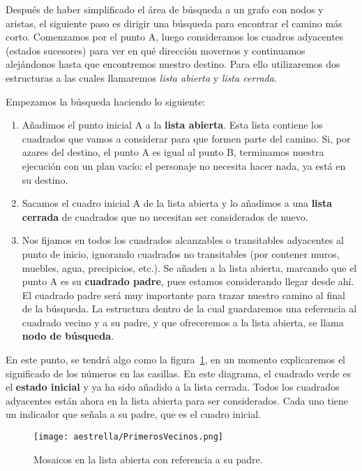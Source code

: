 Después de haber simplificado el área de búsqueda a un grafo con nodos y aristas, el siguiente paso es dirigir una búsqueda para encontrar el camino más corto.  Comenzamos por el punto A, luego consideramos los cuadros adyacentes (estados sucesores) para ver en qué dirección movernos y continuamos alejándonos hasta que encontremos nuestro destino.  Para ello utilizaremos dos estructuras a las cuales llamaremos \emph{lista abierta} y \emph{lista cerrada}.

\noindent Empezamos la búsqueda haciendo lo siguiente:

\begin{enumerate}
  \item Añadimos el punto inicial A a la \textbf{lista abierta}. Esta lista contiene los cuadrados que vamos a considerar para que formen parte del camino. Si, por azares del destino, el punto A es igual al punto B, terminamos nuestra ejecución con un plan vacío: el personaje no necesita hacer nada, ya está en su destino.
  
  \item Sacamos el cuadro inicial A de la lista abierta y lo añadimos a una \textbf{lista cerrada} de cuadrados que no necesitan ser considerados de nuevo.
  
  \item Nos fijamos en todos los cuadrados alcanzables o transitables adyacentes al punto de inicio, ignorando cuadrados no transitables (por contener muros, muebles, agua, precipicios, etc.). Se añaden a la lista abierta, marcando que el punto A es su \textbf{cuadrado padre}, pues estamos considerando llegar desde ahí. El cuadrado padre será muy importante para trazar nuestro camino al final de la búsqueda.  La estructura dentro de la cual guardaremos una referencia al cuadrado vecino y a su padre, y que ofreceremos a la lista abierta, se llama \textbf{nodo de búsqueda}.
\end{enumerate}

En este punto, se tendrá algo como la figura~\ref{fig:fig2P4}, en un momento explicaremos el significado de los números en las casillas. En este diagrama, el cuadrado verde es el \textbf{estado inicial} y ya ha sido añadido a la lista cerrada. Todos los cuadrados adyacentes están ahora en la lista abierta para ser considerados. Cada uno tiene un indicador que señala a su padre, que es el cuadro inicial.

\begin{figure}[h]
  \centering
  \texttt{[image: aestrella/PrimerosVecinos.png]}
  \caption{Mosaicos en la lista abierta con referencia a su padre.}
  \label{fig:fig2P4}
\end{figure}


